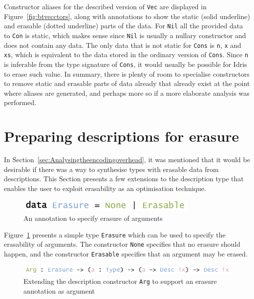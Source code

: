 \documentclass{ituthesis}
\newcommand{\ttconstructor}[1]{\textcolor{constructor-color}{\texttt{#1}}}
\newcommand{\tttype}[1]{\textcolor{type-color}{\texttt{#1}}}
\newcommand{\ttdec}[1]{\textcolor{declared-var-color}{\texttt{#1}}}
\newcommand{\ttvar}[1]{\textcolor{local-var-color}{\texttt{#1}}}
\theoremstyle{break}
\begin{document}
Constructor aliases for the described version of \tttype{Vec} are displayed in Figure~\ref{fig:btvecctors}, along with annotations to show the static (solid underline) and erasable (dotted underline) parts
of the data. For \ttdec{Nil} all the provided data to \ttconstructor{Con} is static, which makes sense since \ttconstructor{Nil} is usually a nullary constructor and does not contain any data.
The only data that is not static for \ttdec{Cons} is \ttvar{n}, \ttvar{x} and \ttvar{xs}, which is equivalent to the data stored in the ordinary version of \ttconstructor{Cons}.
Since \ttvar{n} is inferable from the type signature of \ttdec{Cons}, it would usually be possible for Idris to erase such value.
In summary, there is plenty of room to specialise constructors to remove static and erasable parts of data already that already exist at the point where aliases are generated, and perhaps more so if a more elaborate analysis was performed.

\section{Preparing descriptions for erasure}
\label{sec:Preparingdescriptionsforerasure}
In Section~\ref{sec:Analysingtheencodingoverhead}, it was mentioned that it would be desirable if there was a way to synthesise types with erasable data from descriptions.
This Section presents a few extensions to the description type that enables the user to exploit erasability as an optimisation technique.

\begin{figure}[ht]
\begin{center}
    \includegraphics[scale=0.5]{Figures/ErasureType.png}
\end{center}
\caption{An annotation to specify erasure of arguments}
\label{fig:erasety}
\end{figure}

Figure~\ref{fig:erasety} presents a simple type \tttype{Erasure} which can be used to specify the erasability of arguments.
The constructor \ttconstructor{None} specifies that no erasure should happen, and the constructor \ttconstructor{Erasable} specifies that an argument may be erased.

\begin{figure}[ht]
\begin{center}
    \includegraphics[scale=0.5]{Figures/DescriptionWithErasure.png}
\end{center}
\caption{Extending the description constructor \ttconstructor{Arg} to support an erasure annotation as argument}
\label{fig:erasedesc}
\end{figure}
\end{document}
